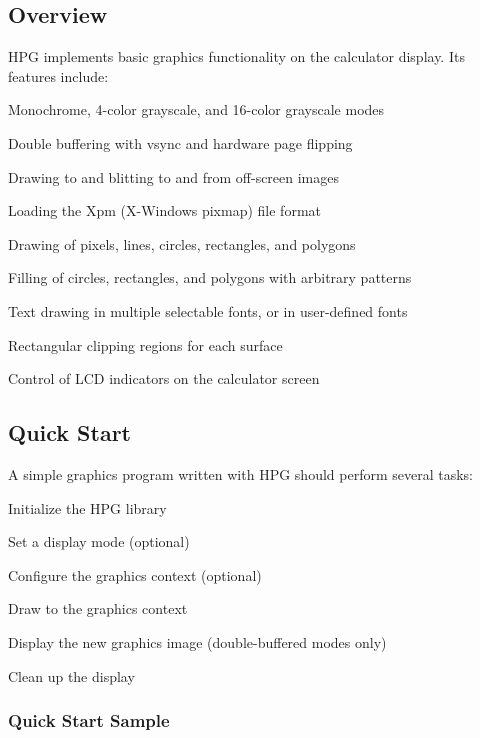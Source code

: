 

\subsection{Overview}\label{overview}


HPG implements basic graphics functionality on the calculator display. Its features include:

\begin{CompactItemize}
\item 
 Monochrome, 4-color grayscale, and 16-color grayscale modes \item 
 Double buffering with vsync and hardware page flipping \item 
 Drawing to and blitting to and from off-screen images \item 
 Loading the Xpm (X-Windows pixmap) file format \item 
 Drawing of pixels, lines, circles, rectangles, and polygons \item 
 Filling of circles, rectangles, and polygons with arbitrary patterns \item 
 Text drawing in multiple selectable fonts, or in user-defined fonts \item 
 Rectangular clipping regions for each surface \item 
 Control of LCD indicators on the calculator screen\end{CompactItemize}
\subsection{Quick Start}\label{quickstart}


A simple graphics program written with HPG should perform several tasks:

\begin{CompactItemize}
\item 
 Initialize the HPG library \item 
 Set a display mode (optional) \item 
 Configure the graphics context (optional) \item 
 Draw to the graphics context \item 
 Display the new graphics image (double-buffered modes only) \item 
 Clean up the display\end{CompactItemize}
\subsubsection{Quick Start Sample}\label{qssample}


